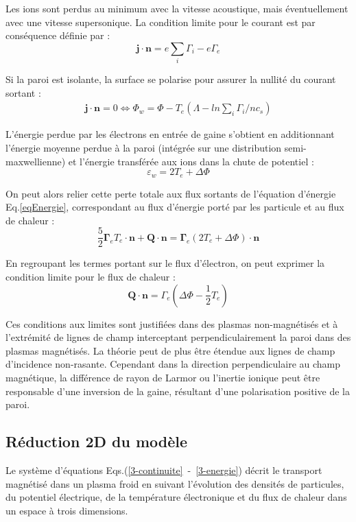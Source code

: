 Les ions sont perdus au minimum avec la vitesse acoustique, mais
éventuellement avec une vitesse supersonique. La condition limite pour le
courant est par conséquence définie par :
\begin{equation}
\mathbf{j}\cdot\mathbf{n}=e\sum_i{\Gamma}_i-e{\Gamma}_e
\end{equation}

Si la paroi est isolante, la surface se polarise pour assurer la nullité du
courant sortant :
\begin{equation}\begin{split}
\mathbf{j}\cdot\mathbf{n}=0\Leftrightarrow
\Phi_w=\Phi-T_e(\Lambda-ln\sum_i\Gamma_i/nc_s)
\end{split}\end{equation}

L'énergie perdue par les électrons en entrée de gaine s'obtient en
additionnant l'énergie moyenne perdue à la paroi (intégrée sur une distribution
semi-maxwellienne) et l'énergie transférée aux ions dans la chute de potentiel :
\begin{equation}
	\varepsilon_w=2T_e+\Delta \Phi
\end{equation}
 
 On peut alors relier cette perte totale aux flux sortants de l'équation
 d'énergie Eq.\ref{eqEnergie}, correspondant au flux d'énergie porté par les
 particule et au flux de chaleur :
\begin{equation}
\frac{5}{2}\boldsymbol{\Gamma}_eT_e\cdot\mathbf{n}+\mathbf{Q}\cdot\mathbf{n}=
\boldsymbol{\Gamma}_e\left(2T_e+\Delta\Phi\right)\cdot\mathbf{n}
\end{equation}

En regroupant les termes portant sur le flux d'électron, on peut exprimer la
condition limite pour le flux de chaleur :
\begin{equation}
\mathbf{Q}\cdot\mathbf{n}=\Gamma_e\left(\Delta\Phi-\frac{1}{2}T_e\right)
\end{equation}

Ces conditions aux limites sont justifiées dans des plasmas
non-magnétisés et à l'extrémité de lignes de champ interceptant
perpendiculairement la paroi dans des plasmas magnétisés. La théorie peut de
plus être étendue aux lignes de champ d'incidence non-rasante. Cependant dans la
direction perpendiculaire au champ magnétique, la différence de rayon de Larmor
ou l'inertie ionique peut être responsable d'une inversion de la gaine,
résultant d'une polarisation positive de la paroi.

\subsection{Réduction 2D du modèle}
Le système d'équations Eqs.(\ref{3-continuite}~-~\ref{3-energie}) décrit le
transport magnétisé dans un plasma froid en suivant l'évolution des densités de
particules, du potentiel électrique, de la température électronique et du flux
de chaleur dans un espace à trois dimensions. 


